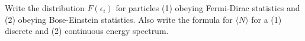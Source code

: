 

\vspace*{\fill}
\centering

Write the distribution $F(\epsilon_{i})$ for particles (1) obeying Fermi-Dirac statistics and (2) obeying Bose-Einstein statistics. Also write the formula for $\langle N \rangle$ for a (1) discrete and (2) continuous energy spectrum.

\centering
\vspace*{\fill}

